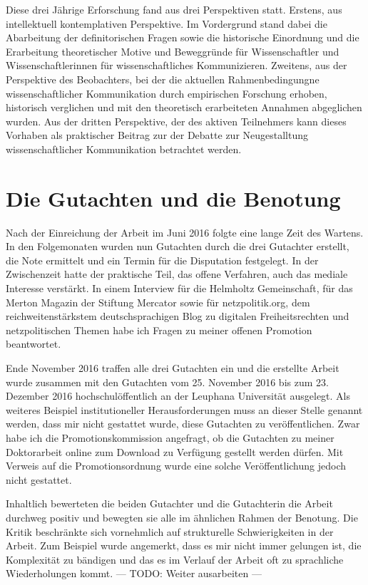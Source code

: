 \begin{vorspann}
Diese drei Jährige Erforschung fand aus drei Perspektiven statt. Erstens, aus intellektuell kontemplativen Perspektive. Im Vordergrund stand dabei die Abarbeitung der definitorischen Fragen sowie die historische Einordnung und die Erarbeitung theoretischer Motive und Beweggründe für Wissenschaftler und Wissenschaftlerinnen für wissenschaftliches Kommunizieren. Zweitens, aus der Perspektive des Beobachters, bei der die aktuellen Rahmenbedingungne wissenschaftlicher Kommunikation durch empirischen Forschung erhoben, historisch verglichen und mit den theoretisch erarbeiteten Annahmen abgeglichen wurden. Aus der dritten Perspektive, der des aktiven Teilnehmers kann dieses Vorhaben als praktischer Beitrag zur der Debatte zur Neugestalltung wissenschaftlicher Kommunikation betrachtet werden.

\section{Die Gutachten und die Benotung}

Nach der Einreichung der Arbeit im Juni 2016 folgte eine lange Zeit des Wartens. In den Folgemonaten wurden nun Gutachten durch die drei Gutachter erstellt, die Note ermittelt und ein Termin für die Disputation festgelegt. In der Zwischenzeit hatte der praktische Teil, das offene Verfahren, auch das mediale Interesse verstärkt. In einem Interview für die Helmholtz Gemeinschaft, für das Merton Magazin der Stiftung Mercator sowie für netzpolitik.org, dem reichweitenstärkstem deutschsprachigen Blog zu digitalen Freiheitsrechten und netzpolitischen Themen habe ich Fragen zu meiner offenen Promotion beantwortet.

Ende November 2016 traffen alle drei Gutachten ein und die erstellte Arbeit wurde zusammen mit den Gutachten vom 25. November 2016 bis zum 23. Dezember 2016 hochschulöffentlich an der Leuphana Universität ausgelegt. Als weiteres Beispiel institutioneller Herausforderungen muss an dieser Stelle genannt werden, dass mir nicht gestattet wurde, diese Gutachten zu veröffentlichen. Zwar habe ich die Promotionskommission angefragt, ob die Gutachten zu meiner Doktorarbeit online zum Download zu Verfügung gestellt werden dürfen. Mit Verweis auf die Promotionsordnung wurde eine solche Veröffentlichung jedoch nicht gestattet.

Inhaltlich bewerteten die beiden Gutachter und die Gutachterin die Arbeit durchweg positiv und bewegten sie alle im ähnlichen Rahmen der Benotung. Die Kritik beschränkte sich vornehmlich auf strukturelle Schwierigkeiten in der Arbeit. Zum Beispiel wurde angemerkt, dass es mir nicht immer gelungen ist, die Komplexität zu bändigen und das es im Verlauf der Arbeit oft zu sprachliche Wiederholungen kommt. --- TODO: Weiter ausarbeiten ---


\end{vorspann}
